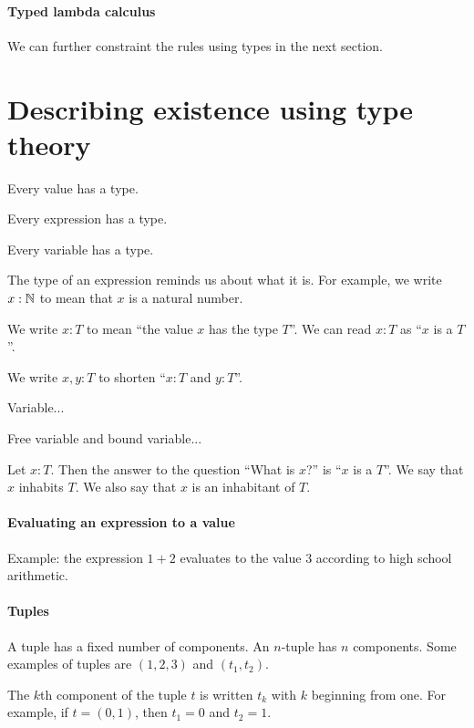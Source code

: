 \paragraph{Typed lambda calculus}
We can further constraint the rules using types in the next section.

\section{Describing existence using type theory}

Every value has a type.

Every expression has a type.

Every variable has a type.

The type of an expression reminds us about what it is.
For example, we write \(x : \mathbb{N}\) to mean that \(x\) is a natural number.

%
We write \( x : T \) to mean ``the value \(x\) has the type \(T\)''.
We can read \(x:T\) as ``\(x\) is a \(T\)''.

We write \( x, y : T \) to shorten ``\( x : T \) and \( y : T \)''.

Variable...

Free variable and bound variable...

Let \(x:T\).
Then the answer to the question \enquote{What is \(x\)?} is \enquote{\(x\) is a \(T\)}.
We say that \(x\) inhabits \(T\).
We also say that \(x\) is an inhabitant of \(T\).

\paragraph{Evaluating an expression to a value}

Example: the expression \(1+2\) evaluates to the value \(3\)
according to high school arithmetic.

\paragraph{Tuples}

%
A tuple has a fixed number of components.
An \(n\)-tuple has \(n\) components.
Some examples of tuples are \( (1,2,3) \) and \( (t_1,t_2) \).

%
The \(k\)th component of the tuple \(t\) is written \( t_k \) with \(k\) beginning from one.
For example, if \( t = (0,1) \), then \( t_1 = 0 \) and \( t_2 = 1 \).

